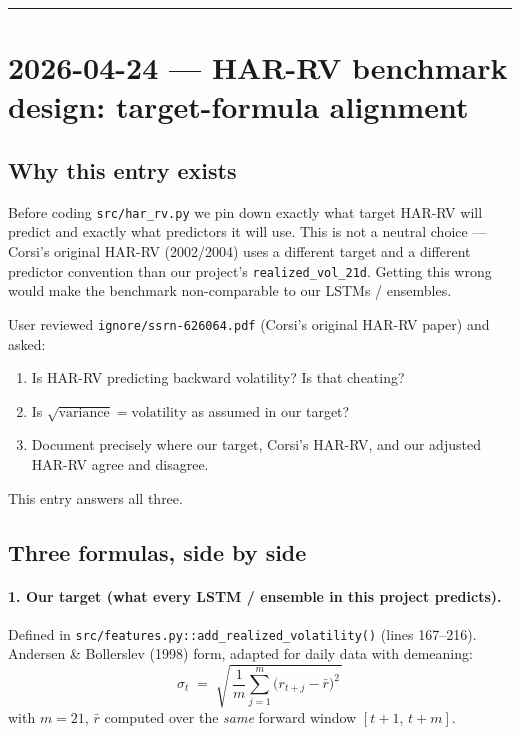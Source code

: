 \documentclass[11pt]{article}
\begin{document}
\vspace{1em}
\hrule
\vspace{1em}

\section*{2026-04-24 --- HAR-RV benchmark design: target-formula alignment}

\subsection*{Why this entry exists}

Before coding \texttt{src/har\_rv.py} we pin down exactly what target HAR-RV will predict and exactly what predictors it will use. This is not a neutral choice --- Corsi's original HAR-RV (2002/2004) uses a different target and a different predictor convention than our project's \texttt{realized\_vol\_21d}. Getting this wrong would make the benchmark non-comparable to our LSTMs / ensembles.

User reviewed \texttt{ignore/ssrn-626064.pdf} (Corsi's original HAR-RV paper) and asked:

\begin{enumerate}[leftmargin=*]
  \item Is HAR-RV predicting backward volatility? Is that cheating?
  \item Is $\sqrt{\text{variance}} = \text{volatility}$ as assumed in our target?
  \item Document precisely where our target, Corsi's HAR-RV, and our adjusted HAR-RV agree and disagree.
\end{enumerate}

This entry answers all three.

\subsection*{Three formulas, side by side}

\paragraph{1. Our target (what every LSTM / ensemble in this project predicts).}
Defined in \texttt{src/features.py::add\_realized\_volatility()} (lines 167--216). Andersen \& Bollerslev (1998) form, adapted for daily data with demeaning:
\begin{equation}
\sigma_t \;=\; \sqrt{\,\frac{1}{m}\sum_{j=1}^{m}\bigl(r_{t+j}-\bar r\bigr)^{2}\,}
\end{equation}
with $m=21$, $\bar r$ computed over the \emph{same} forward window $[t+1,\,t+m]$.
\end{document}
